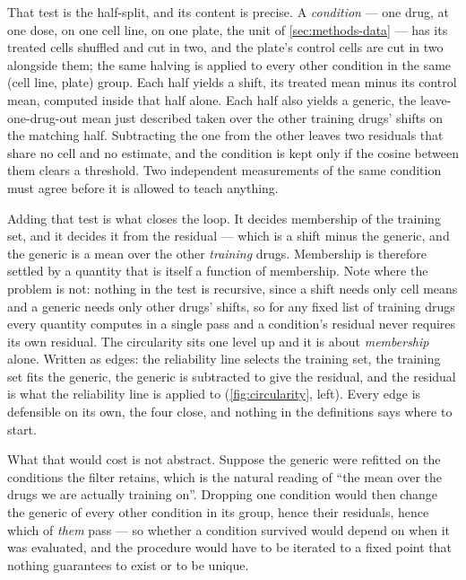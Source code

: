 That test is the half-split, and its content is precise. A \emph{condition} ---
one drug, at one dose, on one cell line, on one plate, the unit of
\cref{sec:methods-data} --- has its treated cells shuffled and cut in two, and the
plate's control cells are cut in two alongside them; the same halving is applied
to every other condition in the same (cell line, plate) group. Each half yields a
shift, its treated mean minus its control mean, computed inside that half alone.
Each half also yields a generic, the leave-one-drug-out mean just described taken
over the other training drugs' shifts on the matching half. Subtracting the one
from the other leaves two residuals that share no cell and no estimate, and the
condition is kept only if the cosine between them clears a threshold. Two
independent measurements of the same condition must agree before it is allowed to
teach anything.

Adding that test is what closes the loop. It decides membership of the training
set, and it decides it from the residual --- which is a shift minus the generic,
and the generic is a mean over the other \emph{training} drugs. Membership is
therefore settled by a quantity that is itself a function of membership. Note
where the problem is not: nothing in the test is recursive, since a shift needs
only cell means and a generic needs only other drugs' shifts, so for any fixed
list of training drugs every quantity computes in a single pass and a condition's
residual never requires its own residual. The circularity sits one level up and it
is about \emph{membership} alone. Written as edges: the reliability line selects
the training set, the training set fits the generic, the generic is subtracted to
give the residual, and the residual is what the reliability line is applied to
(\cref{fig:circularity}, left). Every edge is defensible on its own, the four
close, and nothing in the definitions says where to start.

What that would cost is not abstract. Suppose the generic were refitted on the
conditions the filter retains, which is the natural reading of ``the mean over the
drugs we are actually training on''. Dropping one condition would then change the
generic of every other condition in its group, hence their residuals, hence which
of \emph{them} pass --- so whether a condition survived would depend on when it
was evaluated, and the procedure would have to be iterated to a fixed point that
nothing guarantees to exist or to be unique.

